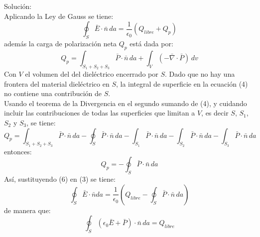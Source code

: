 \documentclass[28pt]{article}
\begin{document}
{\color{WildStrawberry}Solución:}
\\
Aplicando la Ley de Gauss se tiene:
\begin{equation}
  \oint_S \bar{E} \cdot \bar{n}\,da=\frac{1}{\epsilon_{0}}\left( Q_{libre}+Q_{p}\right)
\end{equation}
además la carga de polarización neta $Q_{p}$ está dada por:
\begin{equation}
  Q_{p}=\int_{S_{1}+S_{2}+S_{3}}\bar{P} \cdot \bar{n}\,da + \int_{V}(-\bar{\nabla}\cdot \bar{P})\,dv
\end{equation}
Con $V$ el volumen del del dieléctrico encerrado por $S$. Dado que no hay una frontera del material dieléctrico en $S$, la integral de superficie en la ecuación (4) no contiene una contribución de $S$. \\
Usando el teorema de la Divergencia en el segundo sumando de (4), y cuidando incluir las contribuciones de todas las superficies que limitan a $V$, es decir $S$, $S_{1}$, $S_{2}$ y $S_{3}$, se tiene:
\begin{equation}
  Q_{p}=\int_{S_{1}+S_{2}+S_{3}}\bar{P} \cdot \bar{n}\,da-\oint_S \bar{P}\cdot \bar{n}\,da-\int_{S_{1}} \bar{P}\cdot \bar{n}\,da-\int_{S_{2}} \bar{P}\cdot \bar{n}\,da-\int_{S_{3}} \bar{P}\cdot \bar{n}\,da
\end{equation}
entonces:
\begin{equation}
  Q_{p}=-\oint_S \bar{P}\cdot \bar{n}\,da
\end{equation}
Así, sustituyendo (6) en (3) se tiene:
\begin{equation}
  \oint_S \bar{E} \cdot \bar{n}da=\frac{1}{\epsilon_{0}}\left( Q_{libre}-\oint_S \bar{P}\cdot \bar{n}\,da\right)
  \end{equation}
de manera que:
\begin{equation}
  \oint_S \left( \epsilon_{0}\bar{E}+\bar{P} \right) \cdot \bar{n}\,da=Q_{libre}
\end{equation}
\end{document}
